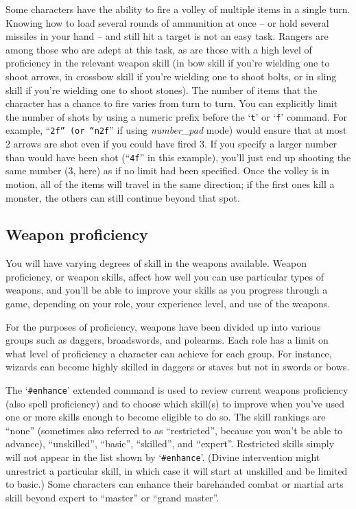 Some characters have the ability to fire a volley of multiple items in a
single turn.  Knowing how to load several rounds of ammunition at
once -- or hold several missiles in your hand -- and still hit a
target is not an easy task.  Rangers are among those who are adept
at this task, as are those with a high level of proficiency in the
relevant weapon skill (in bow skill if you're wielding one to
shoot arrows, in crossbow skill if you're wielding one to shoot bolts,
or in sling skill if you're wielding one to shoot stones).
The number of items that the character has a chance to fire varies from
turn to turn.  You can explicitly limit the number of shots by using a
numeric prefix before the `{\tt t}' or `{\tt f}' command.
For example, ``{\tt 2f'' (or ``n2f}'' if using
{\it number\_pad }
mode) would ensure that at most 2 arrows are shot
even if you could have fired 3.  If you specify
a larger number than would have been shot (``{\tt 4f}'' in this example),
you'll just end up shooting the same number (3, here) as if no limit
had been specified.  Once the volley is in motion, all of the items
will travel in the same direction; if the first ones kill a monster,
the others can still continue beyond that spot.
\subsection*{Weapon proficiency}

You will have varying degrees of skill in the weapons available.
Weapon proficiency, or weapon skills, affect how well you can use
particular types of weapons, and you'll be able to improve your skills
as you progress through a game, depending on your role, your experience
level, and use of the weapons.

For the purposes of proficiency, weapons have
been divided up into various groups such as daggers, broadswords, and
polearms.  Each role has a limit on what level of proficiency a character
can achieve for each group.  For instance, wizards can become highly
skilled in daggers or staves but not in swords or bows.

The `{\tt \#enhance}' extended command is used to review current weapons proficiency
(also spell proficiency) and to choose which skill(s) to improve when
you've used one or more skills enough to become eligible to do so.  The
skill rankings are ``none'' (sometimes also referred to as ``restricted'',
because you won't be able to advance), ``unskilled'', ``basic'', ``skilled'',
and ``expert''.  Restricted skills simply will not appear in the list
shown by `{\tt \#enhance}'.  (Divine intervention might unrestrict a particular
skill, in which case it will start at unskilled and be limited to basic.)
Some characters can enhance their barehanded combat or martial arts skill
beyond expert to ``master'' or ``grand master''.

